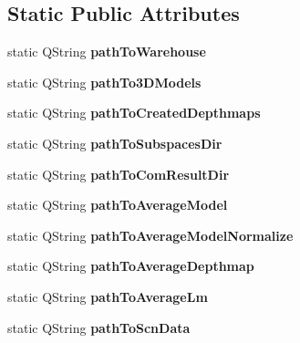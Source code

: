 \subsection*{Static Public Attributes}
\begin{DoxyCompactItemize}
\item 
\hypertarget{class_common_a126b28f6f665f60bc0c1f15e6865b40b}{static Q\+String {\bfseries path\+To\+Warehouse}}\label{class_common_a126b28f6f665f60bc0c1f15e6865b40b}

\item 
\hypertarget{class_common_a17490b41b174d27b74c97be7b9f2c2c1}{static Q\+String {\bfseries path\+To3\+D\+Models}}\label{class_common_a17490b41b174d27b74c97be7b9f2c2c1}

\item 
\hypertarget{class_common_aeb301bd4a539a4a15b6548097a0e0810}{static Q\+String {\bfseries path\+To\+Created\+Depthmaps}}\label{class_common_aeb301bd4a539a4a15b6548097a0e0810}

\item 
\hypertarget{class_common_ab4044707670e3de50abc14fbd30e0b1c}{static Q\+String {\bfseries path\+To\+Subspaces\+Dir}}\label{class_common_ab4044707670e3de50abc14fbd30e0b1c}

\item 
\hypertarget{class_common_a1fb67c0e95b467f14842270e578663fd}{static Q\+String {\bfseries path\+To\+Com\+Result\+Dir}}\label{class_common_a1fb67c0e95b467f14842270e578663fd}

\item 
\hypertarget{class_common_a713604d8a658e98fa63c4604c6e63823}{static Q\+String {\bfseries path\+To\+Average\+Model}}\label{class_common_a713604d8a658e98fa63c4604c6e63823}

\item 
\hypertarget{class_common_a00f003ac02c700a9ac2c21463498ff0f}{static Q\+String {\bfseries path\+To\+Average\+Model\+Normalize}}\label{class_common_a00f003ac02c700a9ac2c21463498ff0f}

\item 
\hypertarget{class_common_a202fba2acf940a741d1135f9745a45fc}{static Q\+String {\bfseries path\+To\+Average\+Depthmap}}\label{class_common_a202fba2acf940a741d1135f9745a45fc}

\item 
\hypertarget{class_common_aaced08da82d7b5d2d68b1c16bce71b23}{static Q\+String {\bfseries path\+To\+Average\+Lm}}\label{class_common_aaced08da82d7b5d2d68b1c16bce71b23}

\item 
\hypertarget{class_common_a3002bdce8d117d2102f2a0408c81c04a}{static Q\+String {\bfseries path\+To\+Scn\+Data}}\label{class_common_a3002bdce8d117d2102f2a0408c81c04a}


\end{DoxyCompactItemize}

